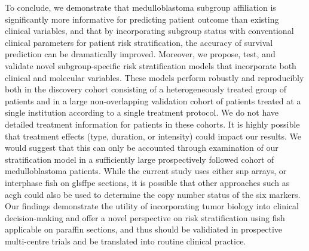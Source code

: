 To conclude, we demonstrate that medulloblastoma subgroup affiliation is significantly more informative for predicting patient outcome than existing clinical variables, and that by incorporating subgroup status with conventional clinical parameters for patient risk stratification, the accuracy of survival prediction can be dramatically improved.  Moreover, we propose, test, and validate novel subgroup-specific risk stratification models that incorporate both clinical and molecular variables.  These models perform robustly and reproducibly both in the discovery cohort consisting of a heterogeneously treated group of patients and in a large non-overlapping validation cohort of patients treated at a single institution according to a single treatment protocol.  We do not have detailed treatment information for patients in these cohorts.  It is highly possible that treatment effects (type, duration, or intensity) could impact our results.  We would suggest that this can only be accounted through examination of our stratification model in a sufficiently large prospectively followed cohort of medulloblastoma patients.  While the current study uses either \gls{snp} arrays, or interphase \gls{fish} on gls{ffpe} sections, it is possible that other approaches such as \gls{acgh} could also be used to determine the copy number status of the six markers.  Our findings demonstrate the utility of incorporating tumor biology into clinical decision-making and offer a novel perspective on risk stratification using \gls{fish} applicable on paraffin sections, and thus should be validiated in prospective multi-centre trials and be translated into routine clinical practice.








\clearpage
